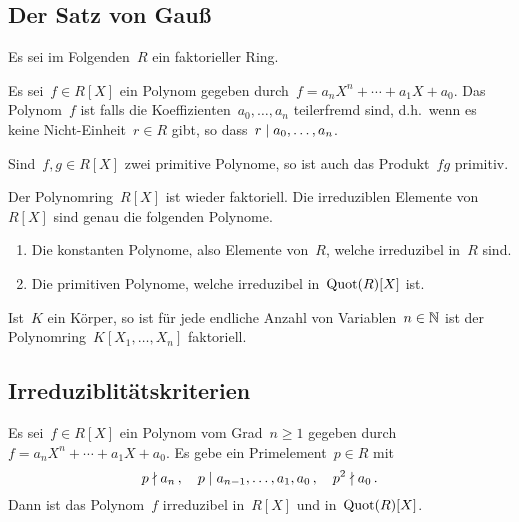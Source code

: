 \subsection{Der Satz von Gauß}

\begin{convention}
  Es sei im Folgenden~$R$ ein faktorieller Ring.
\end{convention}

\begin{definition}
  Es sei~$f \in R[X]$ ein Polynom gegeben durch~$f = a_n X^n + \dotsb + a_1 X + a_0$.
  Das Polynom~$f$ ist  falls die Koeffizienten~$a_0, \dotsc, a_n$ teilerfremd sind, d.h.\ wenn es keine Nicht-Einheit~$r \in R$ gibt, so dass~$r \mid a_0, \dotsc, a_n$.
\end{definition}

\begin{proposition}
  Sind~$f, g \in R[X]$ zwei primitive Polynome, so ist auch das Produkt~$fg$ primitiv.
\end{proposition}

\begin{theorem}
  Der Polynomring~$R[X]$ ist wieder faktoriell.
  Die irreduziblen Elemente von~$R[X]$ sind genau die folgenden Polynome.
  \begin{enumerate}
    \item
      Die konstanten Polynome, also Elemente von~$R$, welche irreduzibel in~$R$ sind.
    \item
      Die primitiven Polynome, welche irreduzibel in~$\operatorname{Quot}(R)[X]$ ist.
  \end{enumerate}
\end{theorem}

\begin{example}
  Ist~$K$ ein Körper, so ist für jede endliche Anzahl von Variablen~$n \in \mathbb{N}$ ist der Polynomring~$K[X_1, \dotsc, X_n]$ faktoriell.
\end{example}



\subsection{Irreduziblitätskriterien}

\begin{proposition}
  Es sei~$f \in R[X]$ ein Polynom vom Grad~$n \geq 1$ gegeben durch~$f = a_n X^n + \dotsb + a_1 X + a_0$.
  Es gebe ein Primelement~$p \in R$ mit
  \[
    p \nmid a_n \,,
    \quad
    p \mid a_{n-1}, \dotsc, a_1, a_0 \,,
    \quad
    p^2 \nmid a_0 \,.
  \]
  Dann ist das Polynom~$f$ irreduzibel in~$R[X]$ und in~$\operatorname{Quot}(R)[X]$.
\end{proposition}

